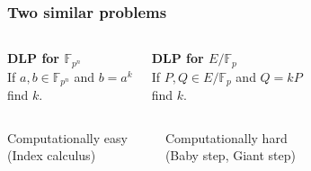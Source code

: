 \documentclass{beamer}
\begin{document}
\begin{frame}
\frametitle{Two similar problems}

\begin{columns}[c] %

\begin{center}
\textbf{DLP for $\mathbb{F}_{p^n}$} \\

If $a, b \in \mathbb{F}_{p^n}$ and $b=a^k$\\
find $k$. \\
\end{center}

\begin{center}
\textbf{DLP for $E/\mathbb{F}_p$} \\
If $P, Q \in E/\mathbb{F}_{p}$ and $Q=kP$ \\
find $k$.
\end{center}
\end{columns}

\pause
\begin{columns}[c] %

\begin{center}
Computationally easy \\ (Index calculus)
\end{center}

 \\ 

\begin{center}
Computationally hard \\ (Baby step, Giant step)
\end{center}
\end{columns}

\end{frame}

\end{document}
